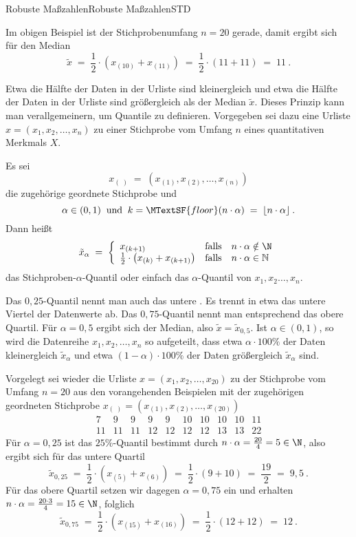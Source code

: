 \begin{MXContent}{Robuste Maßzahlen}{Robuste Maßzahlen}{STD}
\begin{MExample}
Im obigen Beispiel ist der Stichprobenumfang $n=20$ gerade, damit ergibt sich für den Median
$$
\tilde{x}\; =\; \frac{1}{2}\cdot \left({x_{(10)}+x_{(11)} }\right)\; =\;\frac{1}{2}\cdot (11 + 11)\; =\; 11\: .
$$
\end{MExample}

Etwa die Hälfte der Daten in der Urliste sind kleinergleich und etwa die Hälfte der Daten in der Urliste sind größergleich als der Median $\tilde{x}$.
Dieses Prinzip kann man verallgemeinern, um Quantile zu definieren.
Vorgegeben sei dazu eine Urliste $x=(x_{1},x_{2},\ldots ,x_{n})$
zu einer Stichprobe vom Umfang $n$ eines quantitativen Merkmals $X$.

\begin{MInfo}
Es sei
$$
x_{(\; )}\; =\; (x_{(1)},x_{(2)},\ldots ,x_{(n)})
$$
die zugehörige geordnete Stichprobe und
$$
\alpha \in (0,1) \;\;\text{und} \;\; k = \MTextSF{floor}(n\cdot \alpha) \;= \;\lfloor n\cdot \alpha \rfloor\: .
$$
Dann heißt
$$
\tilde{x}_{\alpha }\; =\; \left\lbrace{\begin{array}{lll}x_{(k+1)} & \text{falls} & n\cdot \alpha \notin \N \\ \frac{1}{2} \cdot \left(x_{(k)}+x_{(k+1)}\right) & \text{falls} & n\cdot \alpha \in \mathbb{N}\end{array}}\right.
$$
das Stichproben-$\alpha$-Quantil oder einfach das $\alpha$-Quantil von $x_{1},x_{2}\ldots ,x_{n}$.
\end{MInfo}

Das $0,25$-Quantil nennt man auch das untere . Es trennt in etwa das untere Viertel der Datenwerte ab. Das $0,75$-Quantil nennt man entsprechend das obere Quartil.
Für $\alpha = 0,5$ ergibt sich der Median, also $\tilde{x}=\tilde{x}_{0,5}$.
Ist $\alpha \in (0,1)$, so wird die Datenreihe $x_{1},x_{2},\ldots ,x_{n}$ so aufgeteilt, dass etwa $\alpha\cdot 100\%$ der Daten kleinergleich $\tilde{x}_{\alpha}$ und etwa
$(1-\alpha)\cdot 100\%$ der Daten größergleich $\tilde{x}_{\alpha}$ sind.

\begin{MExample}
Vorgelegt sei wieder die Urliste $x=(x_{1},x_{2},\ldots ,x_{20})$ zu der Stichprobe vom Umfang $n=20$ aus den vorangehenden Beispielen mit der zugehörigen
geordneten Stichprobe $x_{(\; )}=(x_{(1)},x_{(2)},\ldots ,x_{(20)})$
$$
\begin{array}{cccccccccc} 7 & 9 & 9 & 9 & 9 & 10 & 10 & 10 & 10 & 11 \\ 11 & 11 & 11 & 12 & 12 & 12 & 12 & 13 & 13 & 22 \end{array}
$$
Für $\alpha = 0,25$ ist das $25\%$-Quantil bestimmt durch $n\cdot \alpha = \frac{20}{4}=5\in \N$, also
ergibt sich für das untere Quartil
$$
\tilde{x}_{0,25}\;=\;  \frac{1}{2}\cdot\left( x_{(5)}+x_{(6)} \right)\; =\;\frac{1}{2}\cdot (9+10)\; =\; \frac{19}{2}\; =\; 9,5\: .
$$
Für das obere Quartil setzen wir dagegen $\alpha = 0,75$ ein und erhalten
$n\cdot \alpha = \frac{20\cdot 3}{4}=15\in \N$, folglich
$$
\tilde{x}_{0,75}\;=\;\frac{1}{2}\cdot\left( x_{(15)}+x_{(16)} \right) \;=\;\frac{1}{2}\cdot (12+12)\;=\;12\: .
$$
\end{MExample}


\end{MXContent}
